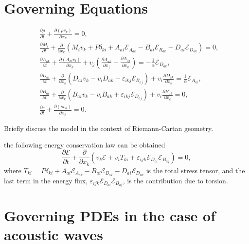 \documentclass[
10pt, %
a4paper, %
oneside, %
headinclude,footinclude, %
BCOR5mm, %
table,
]{scrartcl}
\newcommand{\calE}{\mathcal{E}}						%
\newcommand{\pd}{\partial}
\newcommand{\dist}[2]{ A_{{#1}{#2}} }	%
\newcommand{\burg}[1]{ B_{#1} }	%
\newcommand{\veps}{\varepsilon}
\begin{document}
\section{Governing Equations}
\begin{subequations}\label{PDE}
    \begin{align}
        &\frac{\pd \rho}{\pd t} + \frac{\pd(\rho v_k)}{\pd x_k} = 0,\label{PDE.rho}\\[1mm]
        &\frac{\pd M_i}{\pd t} + \frac{ \pd }{\pd x_k}  \left( M_i v_k + P \delta_{ki} + \dist{a}{i}
        \calE_{\dist{a}{k}} - B_{ai} \calE_{B_{ak}} - D_{ai} \calE_{D_{ak}}
        \right ) = 0,\label{PDE.M}\\[2mm]
        &\frac{\pd \dist{a}{k}}{\pd t} +\frac{\pd (  {\dist{a}{i} v_i}  )}{\pd x_k} + 
        v_j \left(\frac{\pd \dist{a}{k}}{\pd x_j} - \frac{\pd\dist{a}{j}}{\pd x_k}\right) =         
        -\frac{1}{\alpha}\calE_{D_{ak}},\label{PDE.A}\\[2mm]
        &\frac{\pd D_{ai}}{\pd t} + \frac{\pd} {\pd x_k} \left( D_{ai} v_k  -  v_i D_{a k} - \veps_{i k
        j}  \calE_{B_{a j}} \right) + v_i \frac{\pd D_{a k}}{\pd x_k}  =
        \frac{1}{\alpha}\calE_{\dist{a}{i}},\label{PDE.D}\\[2mm]
        &\frac{\pd \burg{ai}}{\pd t} + \frac{\pd}{\pd x_k} \left(
        \burg{ai} v_k - v_i \burg{ak} + \varepsilon _{ikj} \calE_{D_{aj}}
        \right) + v_i \frac{\pd \burg{ak}}{\pd x_k} = 0,\label{PDE.B}\\[2mm]
        &\frac{\pd s}{\pd t} + \frac{\pd (s v_k)}{\pd x_k} = 0.\label{PDE.s}
    \end{align}
\end{subequations}

Briefly discuss the model in the context of Riemann-Cartan geometry.

the following energy conservation law can be obtained
\begin{equation}\label{energy.law}
\frac{\pd \calE}{\pd t} + \frac{\pd }{\pd x_k} \left( v_k \calE + v_i T_{ki} + \veps_{ijk}
\calE_{D_{ai}}\calE_{B_{aj}}\right) = 0,
\end{equation}
where $ T_{ki} = P \delta_{ki} + \dist{a}{i} \calE_{\dist{a}{k}} - B_{ai} \calE_{B_{ak}} - D_{ai}
\calE_{D_{ak}}  $ is the total stress tensor, and the last term in the energy flux, $ \veps_{ijk} 
\calE_{D_{ai}}\calE_{B_{aj}} $, is the contribution due 
to torsion.



\section{Governing PDEs in the case of acoustic waves}
\end{document}
